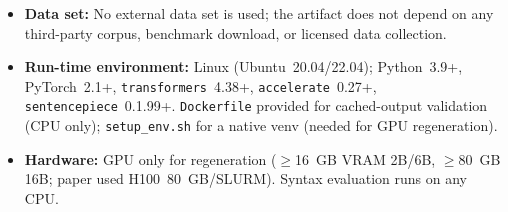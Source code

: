 \documentclass[sigplan,10pt,twocolumn]{acmart}
\begin{document}
\begin{itemize}
\item \textbf{Data set:} No external data set is used; the artifact does not depend on any third-party corpus, benchmark download, or licensed data collection.

\item \textbf{Run-time environment:} Linux (Ubuntu~20.04/22.04); Python~3.9+,
        PyTorch~2.1+, \texttt{transformers}~4.38+, \texttt{accelerate}~0.27+,
        \texttt{sentencepiece}~0.1.99+. \texttt{Dockerfile} provided for
        cached-output validation (CPU only); \texttt{setup\_env.sh} for a
        native venv (needed for GPU regeneration).
        
  \item \textbf{Hardware:} GPU only for regeneration ($\geq$16~GB VRAM
        2B/6B, $\geq$80~GB 16B; paper used H100~80~GB/SLURM). Syntax
        evaluation runs on any CPU.
        

\end{itemize}
\end{document}
